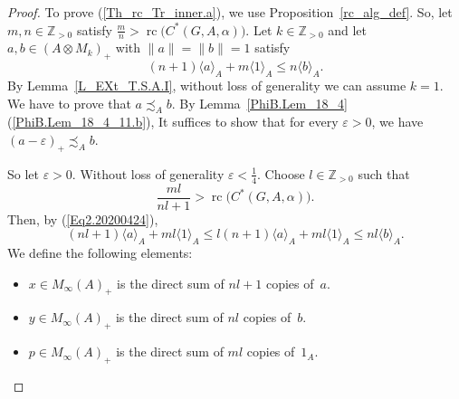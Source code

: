 \documentclass[10pt]{amsart}
\numberwithin{equation}{section}
\theoremstyle{definition}
\newcommand{\af}{\alpha}
\newcommand{\ep}{\varepsilon}
\newcommand{\N}{{\mathbb{Z}}_{> 0}}
\newcommand{\rc}{{\operatorname{rc}}}
\newcommand{\Wolog}{Without loss of generality}
\newcommand{\CGAa}{C^* (G, A, \af)}
\newcommand{\Lem}[1]{Lemma~\ref{#1}}
\begin{document}
\begin{proof}
To prove (\ref{Th_rc_Tr_inner.a}),
we use Proposition~\ref{rc_alg_def}.
So, let $m, n \in \N$ satisfy $\frac{m}{n} > \rc \big(\CGAa \big)$.
Let $k \in \N$ and let $a, b \in ( A \otimes M_k )_{+}$
with $\| a \| = \| b \| = 1$ satisfy
\begin{equation}\label{Eq2.20200424}
(n + 1) \langle a \rangle_{A}
    + m \langle 1 \rangle_{A}
 \leq n \langle b \rangle_{A}.
\end{equation}
By \Lem{L_EXt_T.S.A.I}, without loss of generality we can assume $k = 1$.
We have to prove that $a \precsim_{A} b$.
By \Lem{PhiB.Lem_18_4}(\ref{PhiB.Lem_18_4_11.b}), It suffices to show that
for every $\ep > 0$,
 we have $(a - \ep)_{+} \precsim_{A} b$.

So let $\ep > 0$.
\Wolog{} $\ep < \frac{1}{4}$.
Choose $l \in \N$ such that
%
\begin{equation}\label{Eq_9422_kmkn1}
\frac{ml}{ nl + 1} > {\rc} \big( \CGAa \big).
\end{equation}
%
Then, by (\ref{Eq2.20200424}),
\begin{equation}\label{Eq3.20200424}
(nl + 1) \langle a \rangle_{A}
 + ml \langle 1 \rangle_{A}
  \leq l(n + 1) \langle a \rangle_{A}
     + m l \langle 1 \rangle_{A}
  \leq n l \langle b \rangle_{A}.
\end{equation}
We define the following elements:
\begin{itemize}
\item
$x \in M_{\infty} (A)_{+}$
is the direct sum of $nl + 1$ copies of~$a$.
\item
$y \in M_{\infty} (A)_{+}$
is the direct sum of $nl$ copies of~$b$.
\item
$p \in M_{\infty} (A)_{+}$
is the direct sum of $ml$ copies of~$1_A$.
\end{itemize}


\end{proof}
\end{document}

